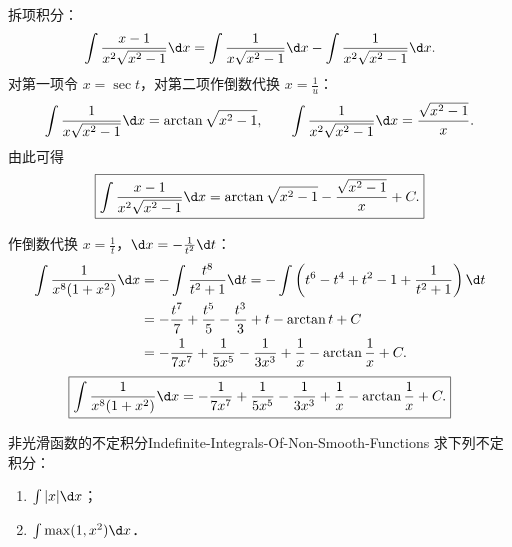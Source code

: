 \begin{solution}

    拆项积分：
    \begin{equation}
        \int \frac{x - 1}{x^2 \sqrt{x^2 - 1}} \d x = \int \frac{1}{x\sqrt{x^2 - 1}} \d x - \int \frac{1}{x^2\sqrt{x^2 - 1}} \d x.
    \end{equation}
    对第一项令 $x = \sec t$，对第二项作倒数代换 $x = \frac{1}{u}$：
    \begin{equation}
        \int \frac{1}{x\sqrt{x^2 - 1}} \d x = \arctan\sqrt{x^2 - 1}, \qquad \int \frac{1}{x^2\sqrt{x^2 - 1}} \d x = \frac{\sqrt{x^2 - 1}}{x}.
    \end{equation}
    由此可得
    \begin{equation}
        \boxed{\int \frac{x - 1}{x^2 \sqrt{x^2 - 1}} \d x = \arctan\sqrt{x^2 - 1} - \frac{\sqrt{x^2 - 1}}{x} + C.}
    \end{equation}


    作倒数代换 $x = \frac{1}{t}$，$\d x = -\frac{1}{t^2}\d t$：
    \begin{equation}
        \begin{aligned}
            \int \frac{1}{x^8(1 + x^2)} \d x & = -\int \frac{t^8}{t^2 + 1} \d t = -\int \left( t^6 - t^4 + t^2 - 1 + \frac{1}{t^2 + 1} \right) \d t \\
                                             & = -\frac{t^7}{7} + \frac{t^5}{5} - \frac{t^3}{3} + t - \arctan t + C                                 \\
                                             & = -\frac{1}{7x^7} + \frac{1}{5x^5} - \frac{1}{3x^3} + \frac{1}{x} - \arctan\frac{1}{x} + C.
        \end{aligned}
    \end{equation}
    \begin{equation}
        \boxed{\int \frac{1}{x^8 (1 + x^2)} \d x = -\frac{1}{7x^7} + \frac{1}{5x^5} - \frac{1}{3x^3} + \frac{1}{x} - \arctan\frac{1}{x} + C.}
    \end{equation}
\end{solution}

\begin{problem}{非光滑函数的不定积分}{Indefinite-Integrals-Of-Non-Smooth-Functions}
    求下列不定积分：
    \begin{enumerate}
        \item $\int |x| \d x$；
        \item $\int \max(1, x^2) \d x$．
    \end{enumerate}
\end{problem}

